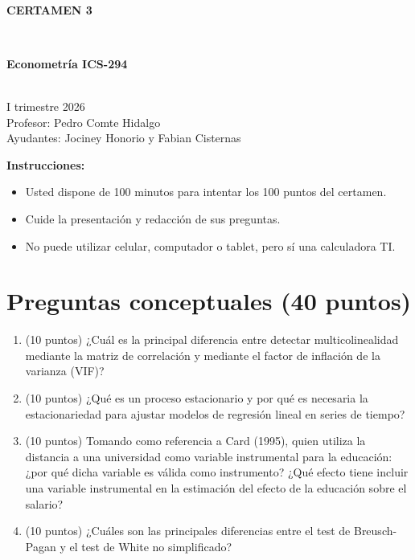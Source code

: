 \documentclass[10pt,a4paper]{article}
\begin{document}
\vspace{5cm}



\begin{center}
\begin{large}
\textbf{\\CERTAMEN 3}
\end{large}\\
\end{center}

\begin{center}
\begin{large}
\textbf{Econometría ICS-294}
\end{large}\\
\vspace{0.2cm}
I trimestre 2026\\
Profesor: Pedro Comte Hidalgo\\
Ayudantes: Jociney Honorio y Fabian Cisternas
\end{center}

\textbf{Instrucciones:} 

\begin{itemize}

    \item Usted dispone de 100 minutos  para intentar los 100 puntos del certamen.
    \item Cuide la presentación y redacción de sus preguntas.
    \item No puede utilizar celular, computador o tablet, pero sí una calculadora TI.
     
\end{itemize}

\section{Preguntas conceptuales (40 puntos)}

\begin{enumerate}

\item (10 puntos) ¿Cuál es la principal diferencia entre detectar multicolinealidad 
mediante la matriz de correlación y mediante el factor de inflación 
de la varianza (VIF)?

\item (10 puntos) ¿Qué es un proceso estacionario y por qué es necesaria la estacionariedad para ajustar modelos de regresión lineal en series de tiempo?

\item (10 puntos) Tomando como referencia a Card (1995), quien utiliza la distancia a una universidad como variable instrumental para la educación: ¿por qué dicha variable es válida como instrumento? ¿Qué efecto tiene incluir una variable instrumental en la estimación del efecto de la educación sobre el salario?

\item (10 puntos) ¿Cuáles son las principales diferencias entre el test de Breusch-Pagan y el test de White no simplificado?


\end{enumerate}
\end{document}
